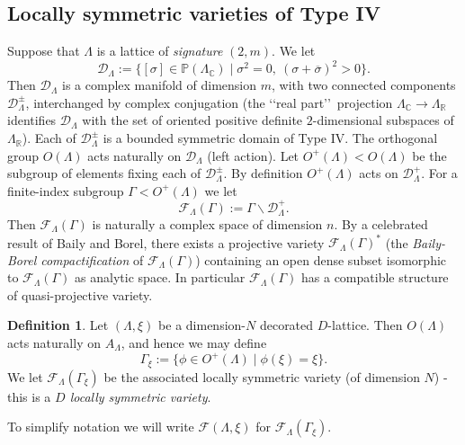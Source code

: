 \documentclass[11pt]{amsart}
\numberwithin{equation}{subsection}
\theoremstyle{plain}
\theoremstyle{remark}
\theoremstyle{definition}
\newtheorem{definition}[theorem]{Definition}
\newcommand{\CC}{{\mathbb C}}
\newcommand{\cD}{{\mathscr D}}
\newcommand{\cF}{{\mathscr F}}
\newcommand{\ov}{\overline}
\newcommand{\PP}{{\mathbb P}}
\newcommand{\RR}{{\mathbb R}}
\begin{document}
\subsection{Locally symmetric varieties of Type IV}\label{subsec:spaziperiodi}
\setcounter{equation}{0}
%
Suppose that $\Lambda$ is a lattice of \emph{signature} $(2,m)$. We let
%
\begin{equation*}
%
\cD_\Lambda:=\{[\sigma] \in\PP(\Lambda_{\CC})\mid \sigma^2=0,\ (\sigma+\ov{\sigma})^2>0\}.
%
\end{equation*}
%
Then $\cD_\Lambda$ is a complex manifold of dimension $m$, with two connected components  $\cD^{\pm}_\Lambda$, interchanged by complex conjugation (the \lq\lq real part\rq\rq\   projection $\Lambda_{\CC}\to\Lambda_{\RR}$ identifies  $\cD_\Lambda$ with the set of oriented positive definite $2$-dimensional subspaces of $\Lambda_{\RR}$).
Each of  $\cD^{\pm}_\Lambda$  is a bounded symmetric domain of Type IV. The orthogonal group $O(\Lambda)$ acts naturally on $\cD_\Lambda$ (left action). Let $O^{+}(\Lambda)<O(\Lambda)$ be the  subgroup of elements fixing each of $\cD^{\pm}_\Lambda$. By definition  $O^{+}(\Lambda)$ acts on $\cD^{+}_\Lambda$.  For  a finite-index subgroup $\Gamma< O^{+}(\Lambda)$ we let
%
\begin{equation*}
%
\cF_\Lambda(\Gamma):=\Gamma\backslash \cD^{+}_\Lambda.
%
\end{equation*}
%
Then $\cF_\Lambda(\Gamma)$ is naturally a complex space of dimension $n$. By a celebrated result of Baily and Borel, there exists  a projective variety  $\cF_\Lambda(\Gamma)^{*}$ (the \emph{Baily-Borel compactification} of  $\cF_\Lambda(\Gamma)$) containing    an open dense subset isomorphic to $\cF_\Lambda(\Gamma)$ as analytic space. In particular  $\cF_\Lambda(\Gamma)$  has a compatible structure of 
quasi-projective variety. 
%
\begin{definition}\label{dfn:decper}
%
Let  $(\Lambda,\xi)$ be a dimension-$N$  decorated $D$-lattice. Then $O(\Lambda)$ acts naturally on $A_\Lambda$, and hence we may define
% 
$$\Gamma_\xi:=\{\phi\in O^+(\Lambda)\mid \phi(\xi)=\xi\}.$$
%
  We let $\cF_{\Lambda}(\Gamma_\xi)$ be the associated  locally symmetric variety (of dimension $N$) - this is a \emph{$D$ locally symmetric variety}.
%
 \end{definition} 
To  simplify notation we will write $\cF(\Lambda,\xi)$  for $\cF_{\Lambda}(\Gamma_\xi)$.
\end{document}
